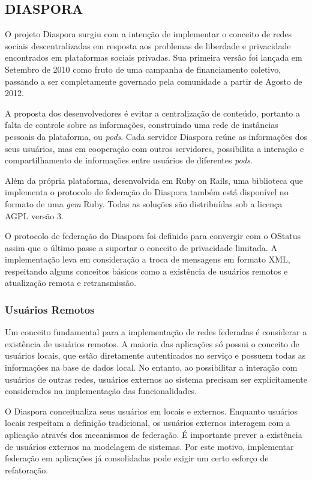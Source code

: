 \subsection{DIASPORA}

O projeto Diaspora surgiu com a intenção de implementar o conceito de redes sociais
descentralizadas em resposta aos problemas de liberdade e privacidade encontrados em
plataformas sociais privadas. Sua primeira versão foi lançada em Setembro de 2010
como fruto de uma campanha de financiamento coletivo, passando a ser completamente
governado pela comunidade a partir de Agosto de 2012.


A proposta dos desenvolvedores é evitar a centralização de conteúdo, portanto a falta
de controle sobre as informações, construindo uma rede de instâncias pessoais da
plataforma, ou \textit{pods}. Cada servidor Diaspora reúne as informações dos seus
usuários, mas em cooperação com outros servidores, possibilita a interação e
compartilhamento de informações entre usuários de diferentes \textit{pods}.

Além da própria plataforma, desenvolvida em Ruby on Rails, uma biblioteca que
implementa o protocolo de federação do Diaspora também está disponível no formato de
uma \textit{gem} Ruby. Todas as soluções são distribuídas sob a licença AGPL versão
3. 

O protocolo de federação do Diaspora foi definido para convergir com o OStatus assim
que o último passe a suportar o conceito de privacidade limitada. A implementação
leva em consideração a troca de mensagens em formato XML, respeitando alguns
conceitos básicos como a existência de usuários remotos e atualização remota e
retransmissão.

\subsubsection{Usuários Remotos}

Um conceito fundamental para a implementação de redes federadas é considerar a
existência de usuários remotos. A maioria das aplicações só possui o conceito de
usuários locais, que estão diretamente autenticados no serviço e possuem todas as
informações na base de dados local. No entanto, ao possibilitar a interação com
usuários de outras redes, usuários externos ao sistema precisam ser explicitamente
considerados na implementação das funcionalidades.

O Diaspora conceitualiza seus usuários em locais e externos. Enquanto usuários locais
respeitam a definição tradicional, os usuários externos interagem com a aplicação
através dos mecanismos de federação. É importante prever a existência de usuários
externos na modelagem de sistemas. Por este motivo, implementar federação em
aplicações já consolidadas pode exigir um certo esforço de refatoração. %

